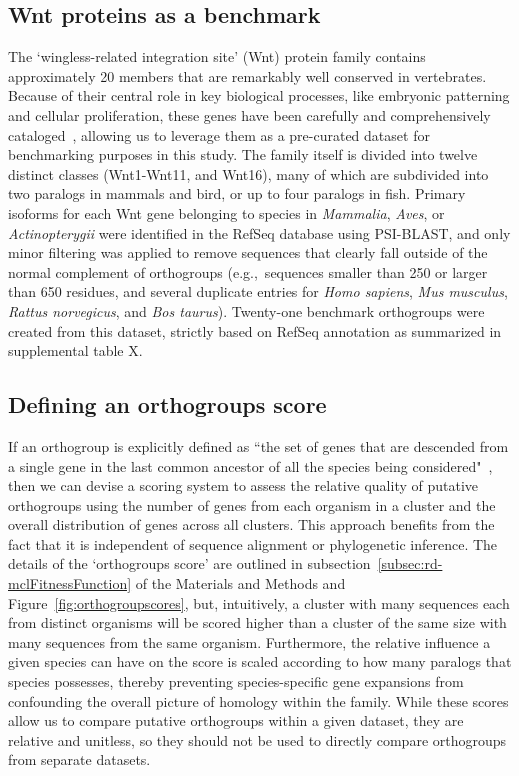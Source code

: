 \documentclass[twocolumn]{bmcart}  %
\begin{document}
\subsection{Wnt proteins as a benchmark}\label{subsec:benchmarkDatasetWnts}
The `wingless-related integration site' (Wnt) protein family contains approximately 20 members that are remarkably well conserved in vertebrates.
Because of their central role in key biological processes, like embryonic patterning and cellular proliferation, these genes have been carefully and comprehensively cataloged~\cite{Garriock:2007hb}, allowing us to leverage them as a pre-curated dataset for benchmarking purposes in this study.
The family itself is divided into twelve distinct classes (Wnt1-Wnt11, and Wnt16), many of which are subdivided into two paralogs in mammals and bird, or up to four paralogs in fish.
Primary isoforms for each Wnt gene belonging to species in \textit{Mammalia}, \textit{Aves}, or \textit{Actinopterygii} were identified in the RefSeq database using PSI-BLAST, and only minor filtering was applied to remove sequences that clearly fall outside of the normal complement of orthogroups (e.g.,\ sequences smaller than 250 or larger than 650 residues, and several duplicate entries for \textit{Homo sapiens}, \textit{Mus musculus}, \textit{Rattus norvegicus}, and \textit{Bos taurus}).
Twenty-one benchmark orthogroups were created from this dataset, strictly based on RefSeq annotation as summarized in supplemental table X\@.

\subsection{Defining an orthogroups score}\label{subsec:definingAnOrthogroupScore}
If an orthogroup is explicitly defined as ``the set of genes that are descended from a single gene in the last common ancestor of all the species being considered"~\cite{Emms:2015ig}, then we can devise a scoring system to assess the relative quality of putative orthogroups using the number of genes from each organism in a cluster and the overall distribution of genes across all clusters.
This approach benefits from the fact that it is independent of sequence alignment or phylogenetic inference.
The details of the `orthogroups score' are outlined in subsection~\ref{subsec:rd-mclFitnessFunction} of the Materials and Methods and Figure~\ref{fig:orthogroupscores}, but, intuitively, a cluster with many sequences each from distinct organisms will be scored higher than a cluster of the same size with many sequences from the same organism.
Furthermore, the relative influence a given species can have on the score is scaled according to how many paralogs that species possesses, thereby preventing species-specific gene expansions from confounding the overall picture of homology within the family.
While these scores allow us to compare putative orthogroups within a given dataset, they are relative and unitless, so they should not be used to directly compare orthogroups from separate datasets.
\end{document}
